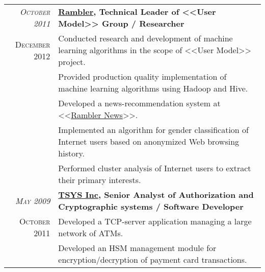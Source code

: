 \documentclass[unicode,a4paper,10pt]{article}
\begin{document}
\begin{tabular}{r p{13cm}}
 \emph{\textsc{October 2011}} & \textbf{\href{http://www.rambler.ru}{Rambler}, Technical Leader of <<User Model>> Group / Researcher} \\
\textsc{December 2012}
&\footnotesize{Conducted research and development of machine learning algorithms in the scope of <<User Model>> project.}\\
&\footnotesize{Provided production quality implementation of machine learning algorithms using Hadoop and Hive.}\\
&\footnotesize{Developed a news-recommendation system at <<\href{http://news.rambler.ru}{Rambler News}>>.}\\
&\footnotesize{Implemented an algorithm for gender classification of Internet users based on anonymized Web browsing history.}\\
&\footnotesize{Performed cluster analysis of Internet users to extract their primary interests.}\\


 \emph{\textsc{May 2009}} & \textbf{\href{http://www.tsys.com}{TSYS Inc}, Senior Analyst of Authorization and Cryptographic systems / Software Developer} \\
\textsc{October 2011}
&\footnotesize{Developed a TCP-server application managing a large network of ATMs.} \\
&\footnotesize{Developed an HSM management module for encryption/decryption of payment card transactions.} \\

 

\end{tabular}
\end{document}
